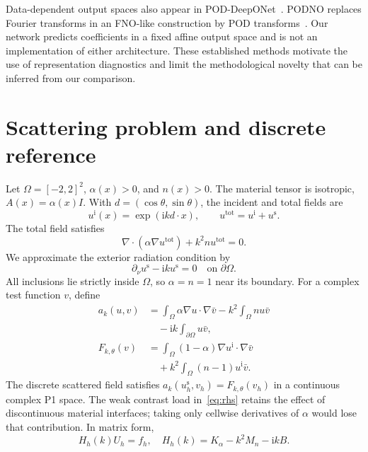 \documentclass{article}
\newcommand{\ii}{\mathrm{i}}
\newcommand{\us}{u^{\mathrm{s}}}
\newcommand{\ut}{u^{\mathrm{tot}}}
\newcommand{\ui}{u^{\mathrm{i}}}
\begin{document}
Data-dependent output spaces also appear in POD-DeepONet~\cite{lu2022}. PODNO replaces Fourier transforms in an FNO-like construction by POD transforms~\cite{cheng2026}. Our network predicts coefficients in a fixed affine output space and is not an implementation of either architecture. These established methods motivate the use of representation diagnostics and limit the methodological novelty that can be inferred from our comparison.

\section{Scattering problem and discrete reference}
Let $\Omega=[-2,2]^2$, $\alpha(x)>0$, and $n(x)>0$. The material tensor is isotropic, $A(x)=\alpha(x)I$. With $d=(\cos\theta,\sin\theta)$, the incident and total fields are
\begin{equation}
\ui(x)=\exp(\ii k d\cdot x),\qquad \ut=\ui+\us.
\end{equation}
The total field satisfies
\begin{equation}
\nabla\cdot(\alpha\nabla\ut)+k^2n\ut=0.
\end{equation}
We approximate the exterior radiation condition by
\begin{equation}
\partial_\nu\us-\ii k\us=0\quad\text{on }\partial\Omega.
\end{equation}
All inclusions lie strictly inside $\Omega$, so $\alpha=n=1$ near its boundary. For a complex test function $v$, define
\begin{align}
a_k(u,v)&=\int_\Omega\alpha\nabla u\cdot\nabla\bar v
-k^2\int_\Omega nu\bar v\nonumber\\
&\hspace{1em}-\ii k\int_{\partial\Omega}u\bar v,\label{eq:weak}\\
F_{k,\theta}(v)&=\int_\Omega(1-\alpha)\nabla\ui\cdot\nabla\bar v\nonumber\\
&\hspace{1em}+k^2\int_\Omega(n-1)\ui\bar v.\label{eq:rhs}
\end{align}
The discrete scattered field satisfies $a_k(\us_h,v_h)=F_{k,\theta}(v_h)$ in a continuous complex P1 space. The weak contrast load in~\eqref{eq:rhs} retains the effect of discontinuous material interfaces; taking only cellwise derivatives of $\alpha$ would lose that contribution. In matrix form,
\begin{equation}
H_h(k)U_h=f_h,\quad H_h(k)=K_\alpha-k^2M_n-\ii k B.
\label{eq:fem}
\end{equation}
\end{document}
